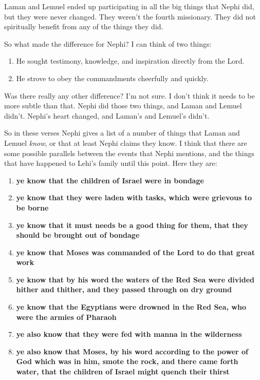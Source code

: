 \begin{compactdesc}
\begin{compactdesc}
		Laman and Lemuel ended up participating in all the big things that Nephi did, but they were never changed. They weren't the fourth missionary. They did not spiritually benefit from any of the things they did. 

		So what made the difference for Nephi? I can think of two things:

		\begin{enumerate}
		\item He sought testimony, knowledge, and inspiration directly from the Lord.
		\item He strove to obey the commandments cheerfully and quickly.
		\end{enumerate}

		Was there really any other difference? I'm not sure. I don't think it needs to be more subtle than that. Nephi did those two things, and Laman and Lemuel didn't. Nephi's heart changed, and Laman's and Lemuel's didn't. 
		\end{compactdesc}

		\item[25--29$\vert$]
		\begin{compactdesc}
		\item[Parallels to Lehi's family] So in these verses Nephi gives a list of a number of things that Laman and Lemuel \textit{know}, or that at least Nephi claims they know. I think that there are some possible parallels between the events that Nephi mentions, and the things that have happened to Lehi's family until this point. Here they are:

		\begin{enumerate}
		\item \textbf{ye know that the children of Israel were in bondage}
		\item \textbf{ye know that they were laden with tasks, which were grievous to be borne}
		\item \textbf{ye know that it must needs be a good thing for them, that they should be brought out of bondage}
		\item \textbf{ye know that Moses was commanded of the Lord to do that great work}
		\item \textbf{ye know that by his word the waters of the Red Sea were divided hither and thither, and they passed through on dry ground}
		\item \textbf{ye know that the Egyptians were drowned in the Red Sea, who were the armies of Pharaoh}
		\item \textbf{ye also know that they were fed with manna in the wilderness}
		\item \textbf{ye also know that Moses, by his word according to the power of God which was in him, smote the rock, and there came forth water, that the children of Israel might quench their thirst}
		\end{enumerate}


\end{compactdesc}
\end{compactdesc}
